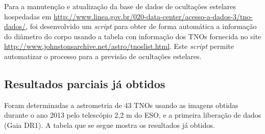 \documentclass[a4paper, 11pt]{article}
\begin{document}
Para a manutenção e atualização da base de dados de ocultações estelares hospedadas em \url{http://www.linea.gov.br/020-data-center/acesso-a-dados-3/tno-dados/}, foi desenvolvido um \textit{script} para obter de forma automática a informação do diâmetro do corpo usando a tabela con informação dos TNOs fornecida no site \url{http://www.johnstonsarchive.net/astro/tnoslist.html}. Este \textit{script} permite automatizar o processo para a previsão de ocultações estelares.     

\subsection{Resultados parciais já obtidos}

Foram determinadas a astrometria de 43 TNOs usando as imagens obtidas durante o ano 2013 pelo telescópio 2,2 m do ESO, e a primeira liberação de dados (Gaia DR1). A tabela que se segue mostra os resultados já obtidos.  
\end{document}
